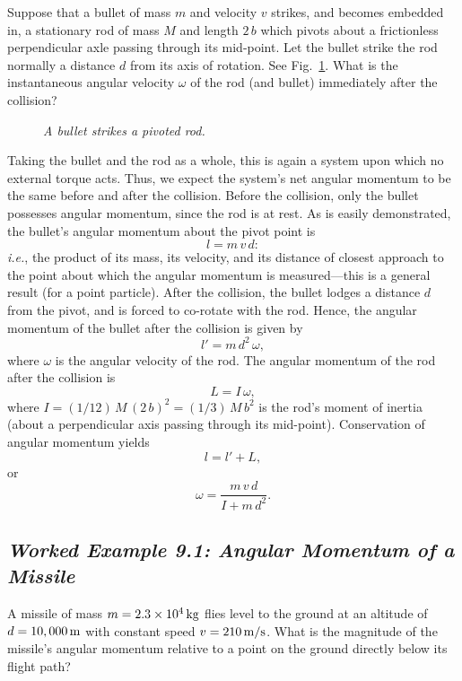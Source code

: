Suppose that a bullet of mass $m$ and velocity $v$ strikes, and becomes
embedded in, a stationary rod of mass $M$ and length $2\,b$ which
pivots about a frictionless perpendicular axle passing through its mid-point.
Let the bullet strike the rod normally a distance $d$ from its
axis of rotation. See Fig.~\ref{f90}. What is the instantaneous angular
velocity $\omega$ of the rod (and bullet) immediately after the collision?

\begin{figure}
\epsfysize=2.5in
\centerline{}
\caption{\em A bullet strikes a pivoted rod.}\label{f90}  
\end{figure}

Taking the bullet and the rod as a whole, this is again a system upon which no
external torque acts. Thus, we expect the system's net angular momentum to
be the same before and after the collision. Before the collision, only the
bullet possesses angular momentum, since the rod is at rest. As is easily demonstrated, the
bullet's angular momentum about the pivot point is
\begin{equation}
l = m\,v\,d:
\end{equation}
{\em i.e.}, the product of its mass, its velocity, and its distance of closest approach
to the point about which the angular momentum is measured---this is a general result
(for a point particle). After the collision, the bullet lodges a distance $d$
from the pivot, and is forced to co-rotate with the
rod. Hence, the angular momentum of the bullet after the collision is given by
\begin{equation}
l' = m\,d^2\,\omega,
\end{equation}
where $\omega$ is the angular velocity of the rod. The angular momentum of the
rod after the collision is
\begin{equation}
L = I\,\omega,
\end{equation}
where $I= (1/12)\,M\,(2\,b)^2= (1/3)\,M\,b^2$ is the rod's moment of inertia (about a perpendicular
axis passing through its mid-point). Conservation of angular
momentum yields
\begin{equation}
l = l' + L,
\end{equation}
or
\begin{equation}
\omega = \frac{m\,v\,d}{I + m\,d^2}.
\end{equation}

\subsection*{\em Worked Example 9.1: Angular Momentum of a Missile}
 A missile of mass $m=2.3\times 10^4\,{\rm kg}$ flies
level to the ground at an
altitude of $d=10,000\,{\rm m}$ with constant speed $v= 210\,{\rm m/s}$. What is the magnitude of the missile's angular momentum
relative to a point on the ground directly below its flight
path?

